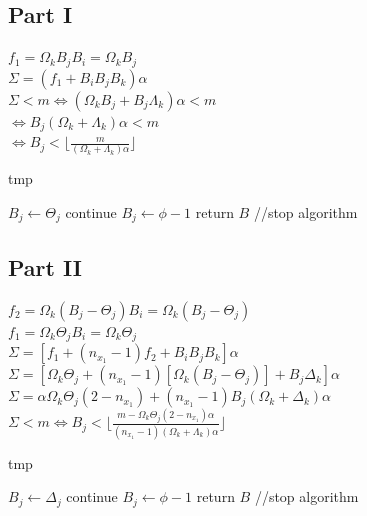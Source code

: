 \documentclass[conference]{IEEEtran}
\begin{document}
  \subsection{Part I}
  \noindent $f_1 = \Omega_k B_j B_i = \Omega_k B_j$ \\
  $\Sigma = (f_1 + B_iB_jB_k)\alpha$ \\
  $\Sigma < m \Leftrightarrow (\Omega_k B_j + B_j \Lambda_k)\alpha < m$ \\
  $\Leftrightarrow B_j (\Omega_k + \Lambda_k) \alpha < m $ \\
  $\Leftrightarrow B_j < \lfloor \frac{m}{(\Omega_k + \Lambda_k)\alpha} \rfloor$

  \begin{algorithm}[h]
    \caption{tmp}
    \begin{algorithmic}[1]
      \STATE $B_j \leftarrow \Theta_j$
      \STATE continue
    \ELSE
      \STATE $B_j \leftarrow \phi - 1$
      \STATE return $B$ //stop algorithm
    \ENDIF
    \end{algorithmic}
  \end{algorithm}

  \subsection{Part II}
  \noindent $f_2 = \Omega_k (B_j - \Theta_j)B_i = \Omega_k(B_j - \Theta_j)$ \\
  $f_1 = \Omega_k\Theta_jB_i = \Omega_k\Theta_j $ \\
  $\Sigma = [f_1 + (n_{x_1} - 1)f_2 + B_iB_jB_k]\alpha$ \\
  $\Sigma = [\Omega_k\Theta_j + (n_{x_1}-1)[\Omega_k(B_j -\Theta_j)] + B_j\Delta_k]\alpha$ \\
  $\Sigma = \alpha\Omega_k\Theta_j(2-n_{x_1})+(n_{x_1}-1)B_j(\Omega_k+\Delta_k)\alpha$ \\
  $\Sigma < m \Leftrightarrow B_j < \lfloor \frac{m - \Omega_k\Theta_j(2-n_{x_1})\alpha}{(n_{x_1}-1)(\Omega_k+\Lambda_k)\alpha} \rfloor $

  \begin{algorithm}[h]
    \caption{tmp}
    \begin{algorithmic}[1]
      \STATE $B_j \leftarrow \Delta_j$
      \STATE continue
    \ELSE
      \STATE $B_j \leftarrow \phi - 1$
      \STATE return $B$ //stop algorithm
    \ENDIF
    \end{algorithmic}
  \end{algorithm}
\end{document}

